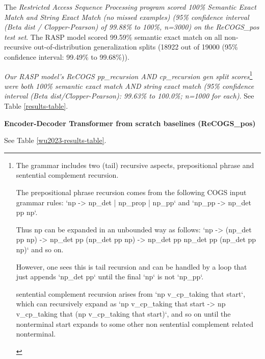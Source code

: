 \documentclass[11pt]{article}
\begin{document}
The \textit{Restricted Access Sequence Processing program scored 100\% Semantic Exact Match and String Exact Match (no missed examples) (95\% confidence interval (Beta dist / Clopper-Pearson) of 99.88\% to 100\%, n=3000) on the ReCOGS\_pos test set}. The RASP model scored 99.59\% semantic exact match on all non-recursive out-of-distribution generalization splits (18922 out of 19000 (95\% confidence interval: 99.49\% to 99.68\%)). 

\textit{Our RASP model's ReCOGS pp\_recursion AND cp\_recursion gen split scores}\footnote{\begin{footnotesize}The grammar includes two (tail) recursive aspects, prepositional phrase and sentential complement recursion.

The prepositional phrase recursion comes from the following COGS input grammar rules: `np -> np\_det | np\_prop | np\_pp` and `np\_pp -> np\_det pp np`.

Thus np can be expanded in an unbounded way as follows: `np -> (np\_det pp np) -> np\_det pp (np\_det pp np) -> np\_det pp np\_det pp (np\_det pp np)` and so on.

However, one sees this is tail recursion and can be handled by a loop that just appends `np\_det pp` until the final `np` is not `np\_pp`.

sentential complement recursion 
arises from `np v\_cp\_taking that start`, 
which can recursively expand as `np v\_cp\_taking that start -> np v\_cp\_taking that (np v\_cp\_taking that start)`, and so on until the nonterminal start expands to some other non sentential complement related nonterminal.
\end{footnotesize}
}\textit{ were both 100\% semantic exact match AND string exact match (95\% confidence interval (Beta dist/Clopper-Pearson): 99.63\% to 100.0\%; n=1000 for each)}. See Table \ref{results-table}.


\textbf{\cite{Wu2023} Encoder-Decoder Transformer from scratch baselines (ReCOGS\_pos)}

See Table \ref{wu2023-results-table}.

\end{document}
